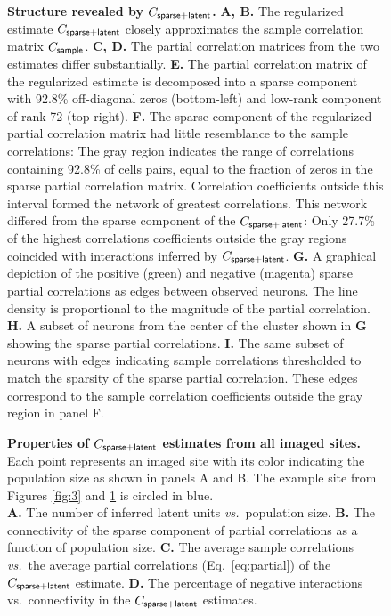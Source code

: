 \begin{figure}
\caption{{\bf Structure revealed by $C_{\sf sparse+latent}$.}
{\bf A, B.} The regularized estimate $C_{\sf sparse+latent}$ closely approximates the sample correlation matrix $C_{\sf sample}$.
{\bf C, D.} The partial correlation matrices from the two estimates differ substantially.
{\bf E.} The partial correlation matrix of the regularized estimate is decomposed into a sparse component with 92.8\% off-diagonal zeros (bottom-left) and low-rank component of rank 72 (top-right).
{\bf F.} The sparse component of the regularized partial correlation matrix had little resemblance to the sample correlations: The gray region indicates the range of correlations containing 92.8\% of cells pairs, equal to the fraction of zeros in the sparse partial correlation matrix. Correlation coefficients outside this interval formed the network of greatest correlations.  This network differed from the sparse component of the $C_{\sf sparse+latent}$:  Only 27.7\% of the highest correlations coefficients outside the gray regions coincided with interactions inferred by $C_{\sf sparse+latent}$.
{\bf G.} A graphical depiction of the positive (green) and negative (magenta) sparse partial correlations as edges between observed neurons. The line density is proportional to the magnitude of the partial correlation.
{\bf H.} A subset of neurons from the center of the cluster shown in {\bf G} showing the sparse partial correlations.
{\bf I.} The same subset of neurons with edges indicating sample correlations thresholded to match the sparsity of the sparse partial correlation. These edges correspond to the sample correlation coefficients outside the gray region in panel F.
}
\label{fig:5}
\end{figure}
 
\begin{figure}
\caption{{\bf Properties of $C_{\sf sparse+latent}$ estimates from all imaged sites.}
Each point represents an imaged site with its color indicating the population size as shown in panels A and B. The example site from Figures \ref{fig:3} and \ref{fig:5} is circled in blue.
\\
{\bf A.} The number of inferred latent units \emph{vs.}~population size.
{\bf B.} The connectivity of the sparse component of partial correlations as a function of population size.
{\bf C.} The average sample correlations \emph{vs.}~the average partial correlations (Eq.~\ref{eq:partial}) of the $C_{\sf sparse+latent}$ estimate.
{\bf D.} The percentage of negative interactions vs.~connectivity in the $C_{\sf sparse+latent}$ estimates.
}
\label{fig:6}
\end{figure}


